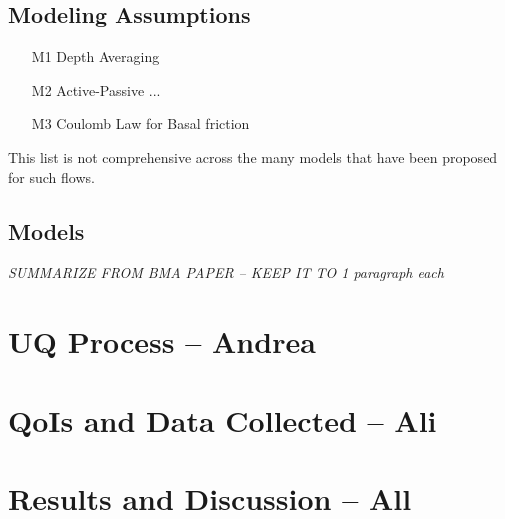 \documentclass{article}
\begin{document}
\subsection{Modeling Assumptions}
\begin{enumerate}
\item[M1] {Depth Averaging}
\item[M2]{Active-Passive ...}
\item[M3] {Coulomb Law for Basal friction}
\end{enumerate}
This list is not comprehensive across the many models that have been proposed for such flows. 
\subsection{Models}
{\it SUMMARIZE FROM BMA PAPER -- KEEP IT TO 1 paragraph each}
\section{UQ Process -- Andrea}
\section{QoIs and Data Collected -- Ali}
\section{Results and Discussion -- All}
\end{document}
